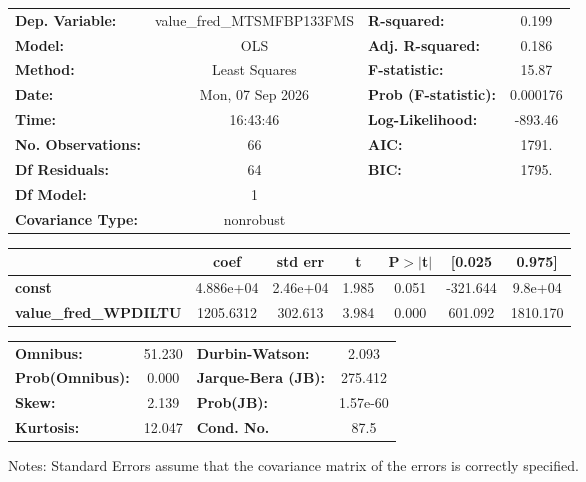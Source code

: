 \begin{center}
\begin{tabular}{lclc}
\toprule
\textbf{Dep. Variable:}       & value\_fred\_MTSMFBP133FMS & \textbf{  R-squared:         } &     0.199   \\
\textbf{Model:}               &            OLS             & \textbf{  Adj. R-squared:    } &     0.186   \\
\textbf{Method:}              &       Least Squares        & \textbf{  F-statistic:       } &     15.87   \\
\textbf{Date:}                &      Mon, 07 Sep 2026      & \textbf{  Prob (F-statistic):} &  0.000176   \\
\textbf{Time:}                &          16:43:46          & \textbf{  Log-Likelihood:    } &   -893.46   \\
\textbf{No. Observations:}    &               66           & \textbf{  AIC:               } &     1791.   \\
\textbf{Df Residuals:}        &               64           & \textbf{  BIC:               } &     1795.   \\
\textbf{Df Model:}            &                1           & \textbf{                     } &             \\
\textbf{Covariance Type:}     &         nonrobust          & \textbf{                     } &             \\
\bottomrule
\end{tabular}
\begin{tabular}{lcccccc}
                              & \textbf{coef} & \textbf{std err} & \textbf{t} & \textbf{P$> |$t$|$} & \textbf{[0.025} & \textbf{0.975]}  \\
\midrule
\textbf{const}                &    4.886e+04  &     2.46e+04     &     1.985  &         0.051        &     -321.644    &      9.8e+04     \\
\textbf{value\_fred\_WPDILTU} &    1205.6312  &      302.613     &     3.984  &         0.000        &      601.092    &     1810.170     \\
\bottomrule
\end{tabular}
\begin{tabular}{lclc}
\textbf{Omnibus:}       & 51.230 & \textbf{  Durbin-Watson:     } &    2.093  \\
\textbf{Prob(Omnibus):} &  0.000 & \textbf{  Jarque-Bera (JB):  } &  275.412  \\
\textbf{Skew:}          &  2.139 & \textbf{  Prob(JB):          } & 1.57e-60  \\
\textbf{Kurtosis:}      & 12.047 & \textbf{  Cond. No.          } &     87.5  \\
\bottomrule
\end{tabular}
\end{center}

Notes: \newline
 [1] Standard Errors assume that the covariance matrix of the errors is correctly specified.